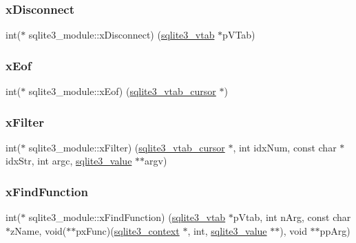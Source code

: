 \mbox{\label{structsqlite3__module_a0107afd3c350db14098edbaae04342df}} 
\subsubsection{\texorpdfstring{xDisconnect}{xDisconnect}}
{\footnotesize\ttfamily int($\ast$ sqlite3\+\_\+module\+::x\+Disconnect) (\mbox{\hyperlink{structsqlite3__vtab}{sqlite3\+\_\+vtab}} $\ast$p\+V\+Tab)}

\mbox{\label{structsqlite3__module_afad8fda57fb28a01196230bc554e44b1}} 
\subsubsection{\texorpdfstring{xEof}{xEof}}
{\footnotesize\ttfamily int($\ast$ sqlite3\+\_\+module\+::x\+Eof) (\mbox{\hyperlink{structsqlite3__vtab__cursor}{sqlite3\+\_\+vtab\+\_\+cursor}} $\ast$)}

\mbox{\label{structsqlite3__module_a46ba11ba4d07f7fdcab4f35bf2045300}} 
\subsubsection{\texorpdfstring{xFilter}{xFilter}}
{\footnotesize\ttfamily int($\ast$ sqlite3\+\_\+module\+::x\+Filter) (\mbox{\hyperlink{structsqlite3__vtab__cursor}{sqlite3\+\_\+vtab\+\_\+cursor}} $\ast$, int idx\+Num, const char $\ast$idx\+Str, int argc, \mbox{\hyperlink{sqlite3_8h_ac2fa1ecdb2290d9af6010edbd1cbc83c}{sqlite3\+\_\+value}} $\ast$$\ast$argv)}

\mbox{\label{structsqlite3__module_afb7bf9d156a767a50f5e9d92b135a80f}} 
\subsubsection{\texorpdfstring{xFindFunction}{xFindFunction}}
{\footnotesize\ttfamily int($\ast$ sqlite3\+\_\+module\+::x\+Find\+Function) (\mbox{\hyperlink{structsqlite3__vtab}{sqlite3\+\_\+vtab}} $\ast$p\+Vtab, int n\+Arg, const char $\ast$z\+Name, void($\ast$$\ast$px\+Func)(\mbox{\hyperlink{sqlite3_8h_a3b519553ffec8fc42b2356f5b1ebdc57}{sqlite3\+\_\+context}} $\ast$, int, \mbox{\hyperlink{sqlite3_8h_ac2fa1ecdb2290d9af6010edbd1cbc83c}{sqlite3\+\_\+value}} $\ast$$\ast$), void $\ast$$\ast$pp\+Arg)}

